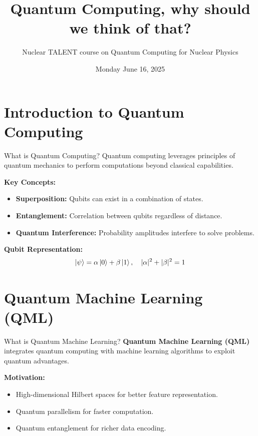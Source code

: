 \documentclass{beamer}
\begin{document}
\title[Quantum Computing and ML]{\textbf{Quantum Computing, why should we think of that?}}
\author{Nuclear TALENT course on Quantum Computing for Nuclear Physics}
\date{Monday June 16, 2025}
\maketitle







\section{Introduction to Quantum Computing}
\begin{frame}{What is Quantum Computing?}
Quantum computing leverages principles of quantum mechanics to perform computations beyond classical capabilities.

\vspace{10pt}
\textbf{Key Concepts:}
\begin{itemize}
\item \textbf{Superposition:} Qubits can exist in a combination of states.
\item \textbf{Entanglement:} Correlation between qubits regardless of distance.
\item \textbf{Quantum Interference:} Probability amplitudes interfere to solve problems.
\end{itemize}

\textbf{Qubit Representation:}
\[
\ket{\psi} = \alpha \ket{0} + \beta \ket{1}, \quad |\alpha|^2 + |\beta|^2 = 1
\]
\end{frame}


\section{Quantum Machine Learning (QML)}
\begin{frame}{What is Quantum Machine Learning?}
\textbf{Quantum Machine Learning (QML)} integrates quantum computing with machine learning algorithms to exploit quantum advantages.

\vspace{10pt}
\textbf{Motivation:}
\begin{itemize}
    \item High-dimensional Hilbert spaces for better feature representation.
    \item Quantum parallelism for faster computation.
    \item Quantum entanglement for richer data encoding.
\end{itemize}


\end{frame}
\end{document}
